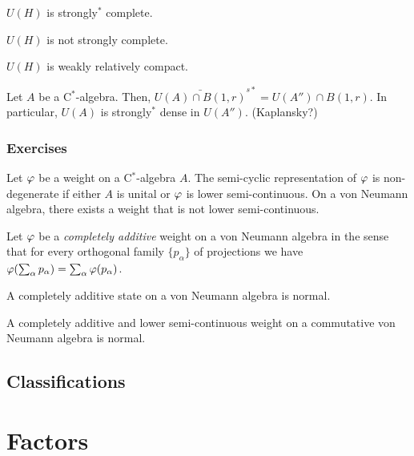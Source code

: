 \documentclass{../../large}
\begin{document}
\begin{prb}
\begin{parts}
\item $U(H)$ is strongly$^*$ complete.
\item $U(H)$ is not strongly complete.
\item $U(H)$ is weakly relatively compact.
\end{parts}
\end{prb}


Let $A$ be a C$^*$-algebra.
Then, $\bar{U(A)\cap B(1,r)}^{s*}=U(A'')\cap B(1,r)$.
In particular, $U(A)$ is strongly$^*$ dense in $U(A'')$.
(Kaplansky?)





\section*{Exercises}
\begin{prb}
Let $\varphi$ be a weight on a C$^*$-algebra $A$.
The semi-cyclic representation of $\varphi$ is non-degenerate if either $A$ is unital or $\varphi$ is lower semi-continuous.
On a von Neumann algebra, there exists a weight that is not lower semi-continuous.
\end{prb}

\begin{prb}
Let $\varphi$ be a \emph{completely additive} weight on a von Neumann algebra in the sense that for every orthogonal family $\{p_\alpha\}$ of projections we have $\varphi(\sum_\alpha p_\alpha)=\sum_\alpha\varphi(p_\alpha)$.
\begin{parts}
\item A completely additive state on a von Neumann algebra is normal.
\item A completely additive and lower semi-continuous weight on a commutative von Neumann algebra is normal.
\end{parts}
\end{prb}




\chapter{Classifications}





\part{Factors}
\end{document}
